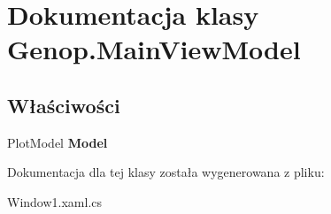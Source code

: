 \hypertarget{classGenop_1_1MainViewModel}{}\section{Dokumentacja klasy Genop.\+Main\+View\+Model}
\label{classGenop_1_1MainViewModel}
\subsection*{Właściwości}
\begin{DoxyCompactItemize}
\item 
Plot\+Model {\bfseries Model}\hypertarget{classGenop_1_1MainViewModel_aa9c636994e88a30f28caaee2435b2423}{}\label{classGenop_1_1MainViewModel_aa9c636994e88a30f28caaee2435b2423}

\end{DoxyCompactItemize}


Dokumentacja dla tej klasy została wygenerowana z pliku\+:\begin{DoxyCompactItemize}
\item 
Window1.\+xaml.\+cs\end{DoxyCompactItemize}
